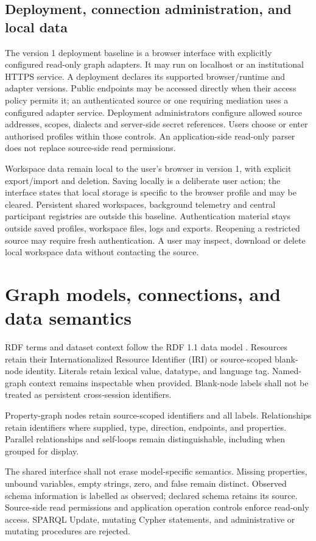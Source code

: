 \documentclass[11pt,a4paper]{article}
\begin{document}
\subsection{Deployment, connection administration, and local data}
The version 1 deployment baseline is a browser interface with explicitly configured read-only graph adapters. It may run on localhost or an institutional HTTPS service. A deployment declares its supported browser/runtime and adapter versions. Public endpoints may be accessed directly when their access policy permits it; an authenticated source or one requiring mediation uses a configured adapter service. Deployment administrators configure allowed source addresses, scopes, dialects and server-side secret references. Users choose or enter authorised profiles within those controls. An application-side read-only parser does not replace source-side read permissions.

Workspace data remain local to the user's browser in version 1, with explicit export/import and deletion. Saving locally is a deliberate user action; the interface states that local storage is specific to the browser profile and may be cleared. Persistent shared workspaces, background telemetry and central participant registries are outside this baseline. Authentication material stays outside saved profiles, workspace files, logs and exports. Reopening a restricted source may require fresh authentication. A user may inspect, download or delete local workspace data without contacting the source.

\section{Graph models, connections, and data semantics}
RDF terms and dataset context follow the RDF 1.1 data model \citep{rdfconcepts}. Resources retain their Internationalized Resource Identifier (IRI) or source-scoped blank-node identity. Literals retain lexical value, datatype, and language tag. Named-graph context remains inspectable when provided. Blank-node labels shall not be treated as persistent cross-session identifiers.

Property-graph nodes retain source-scoped identifiers and all labels. Relationships retain identifiers where supplied, type, direction, endpoints, and properties. Parallel relationships and self-loops remain distinguishable, including when grouped for display.

The shared interface shall not erase model-specific semantics. Missing properties, unbound variables, empty strings, zero, and false remain distinct. Observed schema information is labelled as observed; declared schema retains its source. Source-side read permissions and application operation controls enforce read-only access. SPARQL Update, mutating Cypher statements, and administrative or mutating procedures are rejected.
\end{document}

